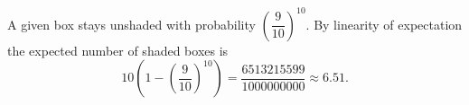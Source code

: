 A given box stays unshaded with probability $\left(\dfrac{9}{10}\right)^{10}$. By linearity of expectation the expected number of shaded boxes is
\[10\left(1-\left(\dfrac{9}{10}\right)^{10}\right)=\boxed{\dfrac{6513215599}{1000000000}}\approx6.51.\]
